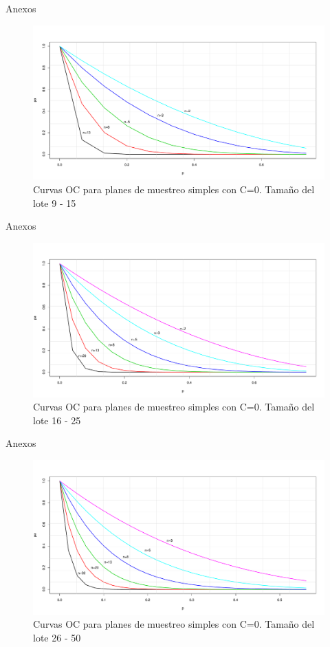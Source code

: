 \documentclass[10pt]{beamer}
\begin{document}
\begin{frame}{Anexos}
\begin{figure}[h!]
  \centering
  \includegraphics[scale=0.33]{FigurasUV/CO2.pdf}
  \caption{Curvas OC para planes de muestreo simples con C=0. Tamaño del lote 9 - 15}
\end{figure}
\end{frame}

\begin{frame}{Anexos}
\begin{figure}[h!]
  \centering
  \includegraphics[scale=0.33]{FigurasUV/CO3.pdf}
  \caption{Curvas OC para planes de muestreo simples con C=0. Tamaño del lote 16 - 25}
\end{figure}
\end{frame}

\begin{frame}{Anexos}
\begin{figure}[h!]
  \centering
  \includegraphics[scale=0.33]{FigurasUV/CO4.pdf}
  \caption{Curvas OC para planes de muestreo simples con C=0. Tamaño del lote 26 - 50}
\end{figure}
\end{frame}
\end{document}
